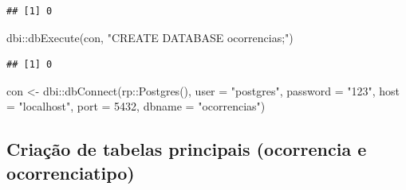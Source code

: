 \documentclass[
]{article}
\newenvironment{Shaded}{\begin{snugshade}}{\end{snugshade}}
\newcommand{\AttributeTok}[1]{\textcolor[rgb]{0.77,0.63,0.00}{#1}}
\newcommand{\DecValTok}[1]{\textcolor[rgb]{0.00,0.00,0.81}{#1}}
\newcommand{\FunctionTok}[1]{\textcolor[rgb]{0.00,0.00,0.00}{#1}}
\newcommand{\NormalTok}[1]{#1}
\newcommand{\OtherTok}[1]{\textcolor[rgb]{0.56,0.35,0.01}{#1}}
\newcommand{\SpecialCharTok}[1]{\textcolor[rgb]{0.00,0.00,0.00}{#1}}
\newcommand{\StringTok}[1]{\textcolor[rgb]{0.31,0.60,0.02}{#1}}
\begin{document}
\begin{verbatim}
## [1] 0
\end{verbatim}

\begin{Shaded}
\begin{Highlighting}[]
\NormalTok{dbi}\SpecialCharTok{::}\FunctionTok{dbExecute}\NormalTok{(con, }\StringTok{"CREATE DATABASE ocorrencias;"}\NormalTok{)}
\end{Highlighting}
\end{Shaded}

\begin{verbatim}
## [1] 0
\end{verbatim}

\begin{Shaded}
\begin{Highlighting}[]
\NormalTok{con }\OtherTok{\textless{}{-}}\NormalTok{ dbi}\SpecialCharTok{::}\FunctionTok{dbConnect}\NormalTok{(rp}\SpecialCharTok{::}\FunctionTok{Postgres}\NormalTok{(),}
                 \AttributeTok{user =} \StringTok{"postgres"}\NormalTok{,}
                 \AttributeTok{password =} \StringTok{"123"}\NormalTok{,}
                 \AttributeTok{host =} \StringTok{"localhost"}\NormalTok{,}
                 \AttributeTok{port =} \DecValTok{5432}\NormalTok{,}
                 \AttributeTok{dbname =} \StringTok{"ocorrencias"}\NormalTok{)}
\end{Highlighting}
\end{Shaded}

\hypertarget{criauxe7uxe3o-de-tabelas-principais-ocorrencia-e-ocorrenciatipo}{%
\subsection{Criação de tabelas principais (ocorrencia e
ocorrenciatipo)}\label{criauxe7uxe3o-de-tabelas-principais-ocorrencia-e-ocorrenciatipo}}
\end{document}
